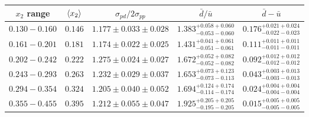{
\renewcommand{\arraystretch}{1.5}
\begin{tabular}{ccccc}
	\hline\hline
	$x_{2}$ range & $\expval{x_{2}}$ & $\sigma_{pd}/2\sigma_{pp}$ & $\bar{d}/\bar{u}$                     & $\bar{d}-\bar{u}$                     \\ \hline
	$0.130-0.160$ & $0.146$          & $1.177\pm0.033\pm0.028$    & $1.383^{+0.058+0.060}_{-0.053-0.060}$ & $0.176^{+0.021+0.024}_{-0.022-0.023}$ \\
	$0.161-0.201$ & $0.181$          & $1.174\pm0.022\pm0.025$    & $1.431^{+0.041+0.061}_{-0.051-0.061}$ & $0.111^{+0.011+0.011}_{-0.011-0.011}$ \\
	$0.202-0.242$ & $0.222$          & $1.275\pm0.024\pm0.027$    & $1.672^{+0.052+0.082}_{-0.052-0.082}$ & $0.092^{+0.012+0.012}_{-0.012-0.012}$ \\
	$0.243-0.293$ & $0.263$          & $1.232\pm0.029\pm0.037$    & $1.653^{+0.073+0.123}_{-0.073-0.113}$ & $0.043^{+0.003+0.013}_{-0.003-0.013}$ \\
	$0.294-0.354$ & $0.324$          & $1.205\pm0.040\pm0.052$    & $1.694^{+0.124+0.174}_{-0.114-0.174}$ & $0.024^{+0.004+0.004}_{-0.004-0.004}$ \\
	$0.355-0.455$ & $0.395$          & $1.212\pm0.055\pm0.047$    & $1.925^{+0.205+0.205}_{-0.195-0.205}$ & $0.015^{+0.005+0.005}_{-0.005-0.005}$ \\ \hline\hline
\end{tabular}
}
